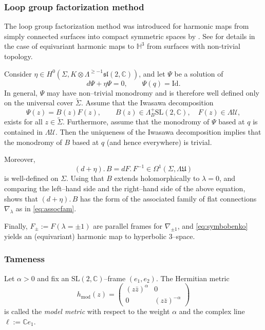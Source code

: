 \documentclass[12pt,a4paper]{amsart}
\theoremstyle{definition}
\theoremstyle{remark}
\newcommand{\C}{\mathbb C}
\begin{document}


\subsubsection{Loop group factorization method}

The loop group factorization method was introduced for harmonic maps from simply connected surfaces into compact
symmetric spaces by \cite{DPW}.
See \cite{HellerHellerTraizet2025} for details in the case of equivariant
harmonic maps to $\mathbb H^3$ from surfaces with non-trivial topology.

Consider $\eta\in H^0(\Sigma, K\otimes \Lambda^{\geq-1}\mathfrak{sl}(2,\C))$, and let
$\Psi$ be a solution of
\[
d\Psi+\eta\Psi=0,
\qquad
\Psi(q)=\mathrm{Id}.
\]
In general, $\Psi$ may have non--trivial monodromy and is therefore well defined
only on the universal cover $\widetilde\Sigma$.
Assume that the Iwasawa decomposition
\[
\Psi(z)=B(z)F(z),
\qquad
B(z)\in \Lambda^{+}_{B}\mathrm{SL}(2,\C),
\quad
F(z)\in \Lambda\mathcal U,
\]
exists for all $z\in\widetilde\Sigma$.
Furthermore, assume that the monodromy of $\Psi$ based at $q$ is contained in
$\Lambda\mathcal U$.
Then the uniqueness of the Iwasawa decomposition implies that the monodromy of
$B$ based at $q$ (and hence everywhere) is trivial.

Moreover,
\[
(d+\eta).\,B
=
dF.\, F^{-1}
\in \Omega^1(\Sigma,\Lambda\mathfrak U)
\]
is well-defined on $\Sigma$.
Using that $B$ extends holomorphically to $\lambda=0$, and comparing the left--hand
side and the right--hand side of the above equation, shows that
$(d+\eta).\,B$ has the form of the associated family of flat connections
$\nabla_\lambda$ as in \eqref{eq:assocfam}.

Finally, $F_\pm:=F(\lambda=\pm1)$ are parallel frames for $\nabla_{\pm1}$, and
\eqref{eq:symbobenko} yields an (equivariant) harmonic map to hyperbolic $3$--space.



\subsubsection{Tameness}

Let $\alpha>0$ and fix an $\mathrm{SL}(2,\C)$--frame $(e_1,e_2)$.
The Hermitian metric
\[
h_{\mathrm{mod}}(z)
=
\begin{pmatrix}
 (z\bar z)^\alpha & 0 \\
 0 & (z\bar z)^{-\alpha}
\end{pmatrix}
\]
is called the \emph{model metric} with respect to the weight $\alpha$ and the
complex line $\ell:=\C e_1$.
\end{document}

